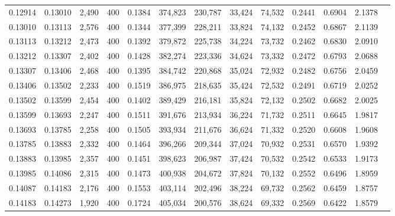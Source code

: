 \begin{tabular}{rrrrrrrrrrrrr}
0.12914 & 0.13010 &  2,490 & 400 &                                     0.1384 & 374,823 & 230,787 &  33,424 &  74,532 & 0.2441 & 0.6904 & 2.1378 \\
0.13010 & 0.13113 &  2,576 & 400 &                                     0.1344 & 377,399 & 228,211 &  33,824 &  74,132 & 0.2452 & 0.6867 & 2.1139 \\
0.13113 & 0.13212 &  2,473 & 400 &                                     0.1392 & 379,872 & 225,738 &  34,224 &  73,732 & 0.2462 & 0.6830 & 2.0910 \\
0.13212 & 0.13307 &  2,402 & 400 &                                     0.1428 & 382,274 & 223,336 &  34,624 &  73,332 & 0.2472 & 0.6793 & 2.0688 \\
0.13307 & 0.13406 &  2,468 & 400 &                                     0.1395 & 384,742 & 220,868 &  35,024 &  72,932 & 0.2482 & 0.6756 & 2.0459 \\
0.13406 & 0.13502 &  2,233 & 400 &                                     0.1519 & 386,975 & 218,635 &  35,424 &  72,532 & 0.2491 & 0.6719 & 2.0252 \\
0.13502 & 0.13599 &  2,454 & 400 &                                     0.1402 & 389,429 & 216,181 &  35,824 &  72,132 & 0.2502 & 0.6682 & 2.0025 \\
0.13599 & 0.13693 &  2,247 & 400 &                                     0.1511 & 391,676 & 213,934 &  36,224 &  71,732 & 0.2511 & 0.6645 & 1.9817 \\
0.13693 & 0.13785 &  2,258 & 400 &                                     0.1505 & 393,934 & 211,676 &  36,624 &  71,332 & 0.2520 & 0.6608 & 1.9608 \\
0.13785 & 0.13883 &  2,332 & 400 &                                     0.1464 & 396,266 & 209,344 &  37,024 &  70,932 & 0.2531 & 0.6570 & 1.9392 \\
0.13883 & 0.13985 &  2,357 & 400 &                                     0.1451 & 398,623 & 206,987 &  37,424 &  70,532 & 0.2542 & 0.6533 & 1.9173 \\
0.13985 & 0.14086 &  2,315 & 400 &                                     0.1473 & 400,938 & 204,672 &  37,824 &  70,132 & 0.2552 & 0.6496 & 1.8959 \\
0.14087 & 0.14183 &  2,176 & 400 &                                     0.1553 & 403,114 & 202,496 &  38,224 &  69,732 & 0.2562 & 0.6459 & 1.8757 \\
0.14183 & 0.14273 &  1,920 & 400 &                                     0.1724 & 405,034 & 200,576 &  38,624 &  69,332 & 0.2569 & 0.6422 & 1.8579 \\

\end{tabular}
